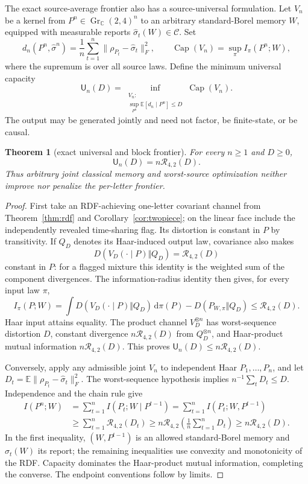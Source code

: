 \documentclass[11pt,a4paper]{article}
\newtheorem{theorem}{Theorem}[section]
\newcommand{\Gr}{\operatorname{Gr}_{\mathbb C}}
\newcommand{\E}{\mathbb E}
\newcommand{\RDF}{\mathcal R_{4,2}}
\newcommand{\cC}{\mathcal C}
\newcommand{\dd}{\mathrm d}
\begin{document}
The exact source-average frontier also has a source-universal formulation.  Let $V_n$ be a kernel from $P^n\in\Gr(2,4)^n$ to an arbitrary standard-Borel memory $W$, equipped with measurable reports $\widehat\sigma_t(W)\in\cC$.  Set
\[
d_n(P^n,\widehat\sigma^n)=\frac1n\sum_{t=1}^n
\lVert\rho_{P_t}-\widehat\sigma_t\rVert_F^2,
\qquad
\operatorname{Cap}(V_n)=\sup_\pi I_\pi(P^n;W),
\]
where the supremum is over all source laws.  Define the minimum universal capacity
\begin{equation}\label{eq:univdef}
\mathsf U_n(D)=\inf_{\substack{V_n:\\ \sup_{P^n}\E[d_n\mid P^n]\le D}}
\operatorname{Cap}(V_n).
\end{equation}
The output may be generated jointly and need not factor, be finite-state, or be causal.

\begin{theorem}[exact universal and block frontier]\label{thm:block}
For every $n\ge1$ and $D\ge0$,
\begin{equation}\label{eq:block}
\boxed{\mathsf U_n(D)=n\RDF(D).}
\end{equation}
Thus arbitrary joint classical memory and worst-source optimization neither improve nor penalize the per-letter frontier.
\end{theorem}

\begin{proof}
First take an RDF-achieving one-letter covariant channel from Theorem~\ref{thm:rdf} and Corollary~\ref{cor:twopiece}; on the linear face include the independently revealed time-sharing flag.  Its distortion is constant in $P$ by transitivity.  If $Q_D$ denotes its Haar-induced output law, covariance also makes
\[
D(V_D(\cdot\mid P)\Vert Q_D)=\RDF(D)
\]
constant in $P$: for a flagged mixture this identity is the weighted sum of the component divergences.  The information-radius identity then gives, for every input law $\pi$,
\[
I_\pi(P;W)
=\int D(V_D(\cdot\mid P)\Vert Q_D)\,\dd\pi(P)
-D(P_{W,\pi}\Vert Q_D)
\le\RDF(D).
\]
Haar input attains equality.  The product channel $V_D^{\otimes n}$ has worst-sequence distortion $D$, constant divergence $n\RDF(D)$ from $Q_D^{\otimes n}$, and Haar-product mutual information $n\RDF(D)$.  This proves $\mathsf U_n(D)\le n\RDF(D)$.

Conversely, apply any admissible joint $V_n$ to independent Haar $P_1,\ldots,P_n$, and let $D_t=\E\lVert\rho_{P_t}-\widehat\sigma_t\rVert_F^2$.  The worst-sequence hypothesis implies $n^{-1}\sum_tD_t\le D$.  Independence and the chain rule give
\begin{align*}
I(P^n;W)
&=\sum_{t=1}^n I(P_t;W\mid P^{t-1})
=\sum_{t=1}^n I(P_t;W,P^{t-1})\\
&\ge\sum_{t=1}^n\RDF(D_t)
\ge n\RDF\!\left(\frac1n\sum_{t=1}^nD_t\right)
\ge n\RDF(D).
\end{align*}
In the first inequality, $(W,P^{t-1})$ is an allowed standard-Borel memory and $\widehat\sigma_t(W)$ its report; the remaining inequalities use convexity and monotonicity of the RDF.  Capacity dominates the Haar-product mutual information, completing the converse.  The endpoint conventions follow by limits.
\end{proof}
\end{document}

